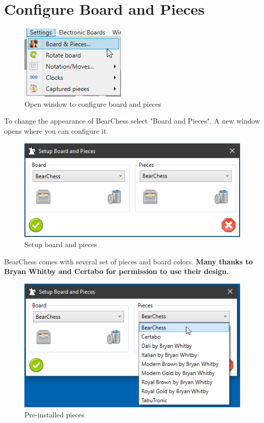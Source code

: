 \documentclass[11pt,a4paper]{article}
\begin{document}
\section{Configure Board and Pieces} \label{BoardAndPieces}

\begin{figure}[H]
	\centering
	\includegraphics[scale=1.0]{SettingsBoardAndPieces.png}
	\caption{Open window to configure board and pieces }
	\label{fig:SettingsBoardAndPieces}
\end{figure}

To change the appearance of BearChess select "Board and Pieces". A new window opens where you can configure it. 

\begin{figure}[H]
	\centering
	\includegraphics[scale=0.9]{SettingsBoardAndPieces2.png}
	\caption{Setup board and pieces }
	\label{fig:SettingsBoardAndPieces2}
\end{figure}

BearChess comes with several set of pieces and board colors. \textbf{Many thanks to Bryan Whitby and Certabo for permission to use their design.}

\begin{figure}[H]
	\centering
	\includegraphics[scale=0.9]{SettingsBoardAndPieces3.png}
	\caption{Pre-installed pieces }
	\label{fig:SettingsBoardAndPieces3}
\end{figure}
\end{document}
